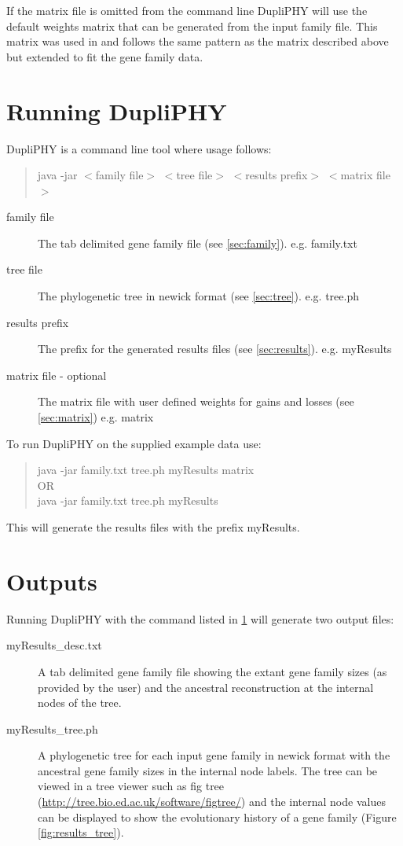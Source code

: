 \documentclass[10pt]{report}
\begin{document}
If the matrix file is omitted from the command line DupliPHY will use the default weights matrix that can be generated from the input family file. This matrix was used in \cite{ames2012determining} and follows the same pattern as the matrix described above but extended to fit the gene family data.

\section{Running DupliPHY}
\label{sec:running}

DupliPHY is a command line tool where usage follows:

\begin{quote}
java -jar $<$family file$>$ $<$tree file$>$ $<$results prefix$>$ $<$matrix file$>$
\end{quote}

\begin{description}
	\item[family file] The tab delimited gene family file (see \ref{sec:family}). e.g. family.txt
	\item[tree file] The phylogenetic tree in newick format (see \ref{sec:tree}). e.g. tree.ph
	\item[results prefix] The prefix for the generated results files (see \ref{sec:results}). e.g. myResults
	\item[matrix file - optional] The matrix file with user defined weights for gains and losses (see \ref{sec:matrix}) e.g. matrix
\end{description}

To run DupliPHY on the supplied example data use:

\begin{quote}
java -jar family.txt tree.ph myResults matrix\\
OR\\
java -jar family.txt tree.ph myResults\\
\end{quote}

This will generate the results files with the prefix myResults.

\section{Outputs}

Running DupliPHY with the command listed in \ref{sec:running} will generate two output files:

\begin{description}
	\item[myResults\_desc.txt] A tab delimited gene family file showing the extant gene family sizes (as provided by the user) and the ancestral reconstruction at the internal nodes of the tree.
	\item[myResults\_tree.ph] A phylogenetic tree for each input gene family in newick format with the ancestral gene family sizes in the internal node labels. The tree can be viewed in a tree viewer such as fig tree (\url{http://tree.bio.ed.ac.uk/software/figtree/}) and the internal node values can be displayed to show the evolutionary history of a gene family (Figure \ref{fig:results_tree}).
\end{description}
\end{document}
